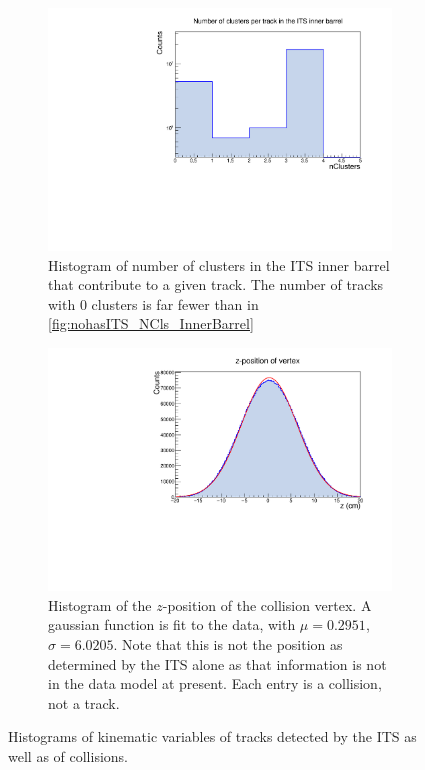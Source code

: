 \begin{figure}[H]
\begin{subfigure}[t]{.49\linewidth}
    \end{subfigure}
    \begin{subfigure}[t]{.49\linewidth}
        \centering
        \includegraphics[width=\linewidth]{Plots/pass4_TracksIU/itsNClsInnerBarrel.pdf}
        \caption{Histogram of number of clusters in the ITS inner barrel that contribute to a given track. The number of tracks with 0 clusters is far fewer than in \cref{fig:nohasITS_NCls_InnerBarrel}}
        \label{fig:ITS_NCls_InnerBarrel}
    \end{subfigure}
    \hfill
    \begin{subfigure}[t]{.49\linewidth}
        \centering
        \includegraphics[width=\linewidth]{Plots/pass4_TracksIU/Z.pdf}
        \caption{Histogram of the $z$-position of the collision vertex. A gaussian function is fit to the data, with $\mu=0.2951$, $\sigma=6.0205$. Note that this is not the position as determined by the ITS alone as that information is not in the data model at present. Each entry is a collision, not a track.}
        \label{fig:ITS_Z}
    \end{subfigure}
\caption[Histograms of $\eta$, $\varphi$, , and $z$ for tracks in the ITS]{Histograms of kinematic variables of tracks detected by the ITS as well as of collisions.}
\label{fig:ITS_1D}
\end{figure}

